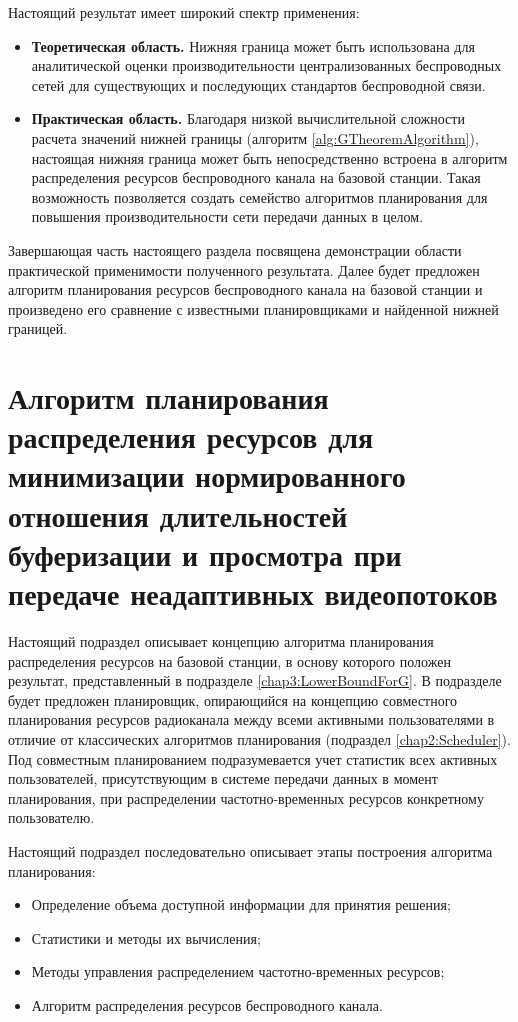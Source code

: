 Настоящий результат имеет широкий спектр применения:
\begin{itemize}
	\item \textbf{Теоретическая область.} Нижняя граница может быть использована для аналитической оценки производительности централизованных беспроводных сетей для существующих и последующих стандартов беспроводной связи.
	\item \textbf{Практическая область.} Благодаря низкой вычислительной сложности расчета значений нижней границы (алгоритм \ref{alg:GTheoremAlgorithm}), настоящая нижняя граница может быть непосредственно встроена в алгоритм распределения ресурсов беспроводного канала на базовой станции. Такая возможность позволяется создать семейство алгоритмов планирования для повышения производительности сети передачи данных в целом.
\end{itemize}

Завершающая часть настоящего раздела посвящена демонстрации области практической применимости полученного результата. Далее будет предложен алгоритм планирования ресурсов беспроводного канала на базовой станции и произведено его сравнение с известными планировщиками и найденной нижней границей.

\section{Алгоритм планирования распределения ресурсов для минимизации нормированного отношения длительностей буферизации и просмотра при передаче неадаптивных видеопотоков}
\label{chap3:NonAdaptiveScheduler}

Настоящий подраздел описывает концепцию алгоритма планирования распределения ресурсов на базовой станции, в основу которого положен результат, представленный в подразделе \ref{chap3:LowerBoundForG}. В подразделе будет предложен планировщик, опирающийся на концепцию совместного планирования ресурсов радиоканала между всеми активными пользователями в отличие от классических алгоритмов планирования (подраздел \ref{chap2:Scheduler}). Под совместным планированием подразумевается учет статистик всех активных пользователей, присутствующим в системе передачи данных в момент планирования, при распределении частотно-временных ресурсов конкретному пользователю.

Настоящий подраздел последовательно описывает этапы построения алгоритма планирования:
\begin{itemize}
	\item Определение объема доступной информации для принятия решения;
	\item Статистики и методы их вычисления;
	\item Методы управления распределением частотно-временных ресурсов;
	\item Алгоритм распределения ресурсов беспроводного канала.
\end{itemize}

